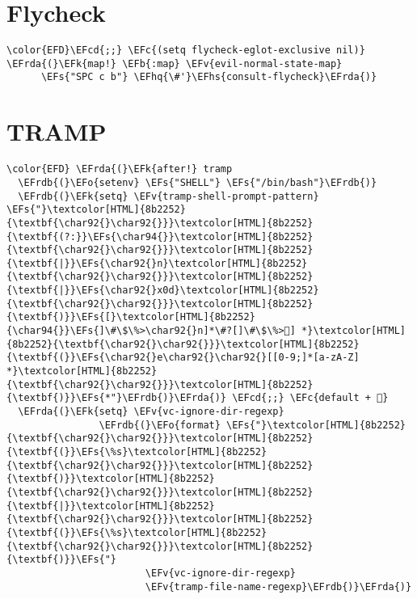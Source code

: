 \documentclass[12pt]{article}
\theoremstyle{plain}%
\theoremstyle{definition}
\theoremstyle{remark}
\newcommand{\EFc}[1]{\textcolor{EFc}{#1}} %
\newcommand{\EFcd}[1]{\textcolor{EFcd}{#1}} %
\newcommand{\EFs}[1]{\textcolor{EFs}{#1}} %
\newcommand{\EFk}[1]{\textcolor{EFk}{#1}} %
\newcommand{\EFb}[1]{\textcolor{EFb}{#1}} %
\newcommand{\EFv}[1]{\textcolor{EFv}{#1}} %
\newcommand{\EFo}[1]{\textcolor{EFo}{#1}} %
\newcommand{\EFhq}[1]{\textcolor{EFhq}{#1}} %
\newcommand{\EFhs}[1]{\textcolor{EFhs}{#1}} %
\newcommand{\EFrda}[1]{\textcolor{EFrda}{#1}} %
\newcommand{\EFrdb}[1]{\textcolor{EFrdb}{#1}} %
\begin{document}
\section{Flycheck}
\label{sec:orgc15b0be}
\begin{Code}
\begin{Verbatim}
\color{EFD}\EFcd{;;} \EFc{(setq flycheck-eglot-exclusive nil)}
\EFrda{(}\EFk{map!} \EFb{:map} \EFv{evil-normal-state-map}
      \EFs{"SPC c b"} \EFhq{\#'}\EFhs{consult-flycheck}\EFrda{)}
\end{Verbatim}
\end{Code}
\section{TRAMP}
\label{sec:org381aacd}
\begin{Code}
\begin{Verbatim}
\color{EFD} \EFrda{(}\EFk{after!} tramp
  \EFrdb{(}\EFo{setenv} \EFs{"SHELL"} \EFs{"/bin/bash"}\EFrdb{)}
  \EFrdb{(}\EFk{setq} \EFv{tramp-shell-prompt-pattern} \EFs{"}\textcolor[HTML]{8b2252}{\textbf{\char92{}\char92{}}}\textcolor[HTML]{8b2252}{\textbf{(?:}}\EFs{\char94{}}\textcolor[HTML]{8b2252}{\textbf{\char92{}\char92{}}}\textcolor[HTML]{8b2252}{\textbf{|}}\EFs{\char92{}n}\textcolor[HTML]{8b2252}{\textbf{\char92{}\char92{}}}\textcolor[HTML]{8b2252}{\textbf{|}}\EFs{\char92{}x0d}\textcolor[HTML]{8b2252}{\textbf{\char92{}\char92{}}}\textcolor[HTML]{8b2252}{\textbf{)}}\EFs{[}\textcolor[HTML]{8b2252}{\char94{}}\EFs{]\#\$\%>\char92{}n]*\#?[]\#\$\%>] *}\textcolor[HTML]{8b2252}{\textbf{\char92{}\char92{}}}\textcolor[HTML]{8b2252}{\textbf{(}}\EFs{\char92{}e\char92{}\char92{}[[0-9;]*[a-zA-Z] *}\textcolor[HTML]{8b2252}{\textbf{\char92{}\char92{}}}\textcolor[HTML]{8b2252}{\textbf{)}}\EFs{*"}\EFrdb{)}\EFrda{)} \EFcd{;;} \EFc{default + }
  \EFrda{(}\EFk{setq} \EFv{vc-ignore-dir-regexp}
                \EFrdb{(}\EFo{format} \EFs{"}\textcolor[HTML]{8b2252}{\textbf{\char92{}\char92{}}}\textcolor[HTML]{8b2252}{\textbf{(}}\EFs{\%s}\textcolor[HTML]{8b2252}{\textbf{\char92{}\char92{}}}\textcolor[HTML]{8b2252}{\textbf{)}}\textcolor[HTML]{8b2252}{\textbf{\char92{}\char92{}}}\textcolor[HTML]{8b2252}{\textbf{|}}\textcolor[HTML]{8b2252}{\textbf{\char92{}\char92{}}}\textcolor[HTML]{8b2252}{\textbf{(}}\EFs{\%s}\textcolor[HTML]{8b2252}{\textbf{\char92{}\char92{}}}\textcolor[HTML]{8b2252}{\textbf{)}}\EFs{"}
                        \EFv{vc-ignore-dir-regexp}
                        \EFv{tramp-file-name-regexp}\EFrdb{)}\EFrda{)}
\end{Verbatim}
\end{Code}
\end{document}
